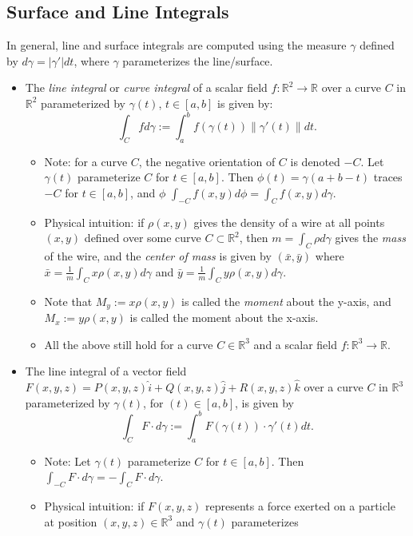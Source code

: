 \documentclass[12pt]{article}
\begin{document}
\subsection*{Surface and Line Integrals}

In general, line and surface integrals are computed using the measure $\gamma$
defined by $d\gamma = |\gamma'|dt$, where $\gamma$ parameterizes the
line/surface.
\begin{itemize}
\item The {\it line integral} or {\it curve integral} of a scalar field
$f : \mathbb{R}^2 \rightarrow \mathbb{R}$ over a curve $C$ in $\mathbb{R}^2$
parameterized by $\gamma(t)$, $t \in [a,b]$ is given by:
$$
\int_C f d\gamma := \int_a^b f(\gamma(t))\|\gamma'(t)\|dt.
$$
\begin{itemize}
\item Note: for a curve $C$, the negative orientation of $C$ is denoted $-C$.
Let $\gamma(t)$ parameterize $C$ for $t\in[a,b]$.
Then $\phi(t) = \gamma(a+b-t)$ traces $-C$ for $t\in[a,b]$, and
$\phi$ $\int_{-C} f(x,y) d\phi = \int_C f(x,y) d\gamma$.
\item Physical intuition: if $\rho(x,y)$ gives the density of a wire at
all points $(x,y)$ defined over some curve $C \subset \mathbb{R}^2$, then
$m = \int_C \rho d\gamma$ gives the {\it mass} of the wire, and the 
{\it center of mass} is given by $(\bar{x}, \bar{y})$ where
$\bar{x} = \frac{1}{m}\int_C x\rho(x,y) d\gamma$ and 
$\bar{y} = \frac{1}{m}\int_C y\rho(x,y) d\gamma$.
\item Note that $M_y := x\rho(x,y)$ is called the {\it moment} about the
y-axis, and $M_x := y\rho(x,y)$ is called the moment about the x-axis.
\item All the above still hold for a curve $C\in\mathbb{R}^3$ and a scalar
field $f : \mathbb{R}^3 \rightarrow \mathbb{R}$.
\end{itemize}
\item The line integral of a vector field 
$F(x,y,z) = P(x,y,z)\hat{i} + Q(x,y,z)\hat{j} + R(x,y,z)\hat{k}$ over a curve
$C$ in $\mathbb{R}^3$ parameterized by $\gamma(t)$, for $(t) \in [a,b]$, is
given by
$$
\int_C F \cdot d\gamma := \int_a^b F(\gamma(t)) \cdot \gamma'(t) dt.
$$
\begin{itemize}
\item Note: Let $\gamma(t)$ parameterize $C$ for $t\in[a,b]$.
Then $\int_{-C} F \cdot d\gamma = -\int_C F \cdot d\gamma$.
\item Physical intuition: if $F(x,y,z)$ represents a force exerted on a
particle at position $(x,y,z)\in\mathbb{R}^3$ and $\gamma(t)$ parameterizes

\end{itemize}
\end{itemize}
\end{document}
